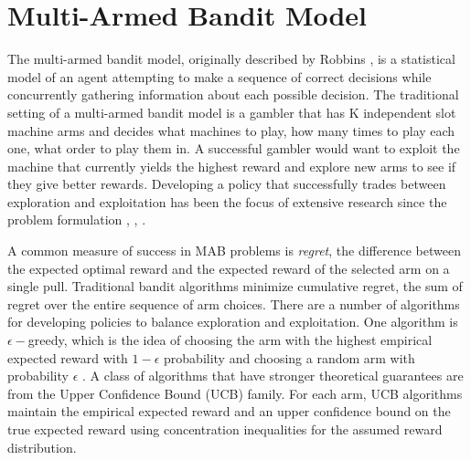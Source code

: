 \documentclass[letterpaper, 10 pt, conference]{ieeeconf}  %
\begin{document}
\section{Multi-Armed Bandit Model}
The multi-armed bandit model, originally described by Robbins \cite{robbins1985some}, is a statistical model of an agent attempting to make a sequence of correct decisions while concurrently gathering information about each possible decision.
The traditional setting of a multi-armed bandit model is a gambler that has K independent slot machine arms and decides what machines to play, how many times to play each one, what order to play them in.
A successful gambler would want to exploit the machine that currently yields the highest reward and explore new arms to see if they give better rewards.
Developing a policy that successfully trades between exploration and exploitation has been the focus of extensive research since the problem formulation \cite{bubeck2009pure}, \cite{robbins1985some}, \cite{bergemann2006bandit}.

A common measure of success in MAB problems is {\it regret}, the difference between the expected optimal reward and the expected reward of the selected arm on a single pull.
Traditional bandit algorithms minimize cumulative regret,  the sum of regret over the entire sequence of arm choices. There are a number of algorithms for developing policies to balance exploration and exploitation.
One algorithm is $\epsilon-$greedy, which is the idea of choosing the arm with the highest empirical expected reward with $1-\epsilon$ probability and choosing a random arm with probability $\epsilon$ \cite{barto1998reinforcement}.
A class of algorithms that have stronger theoretical guarantees are from the Upper Confidence Bound (UCB) family.
For each arm, UCB algorithms maintain the empirical expected reward and an upper confidence bound on the true expected reward using concentration inequalities for the assumed reward distribution.

\end{document}
